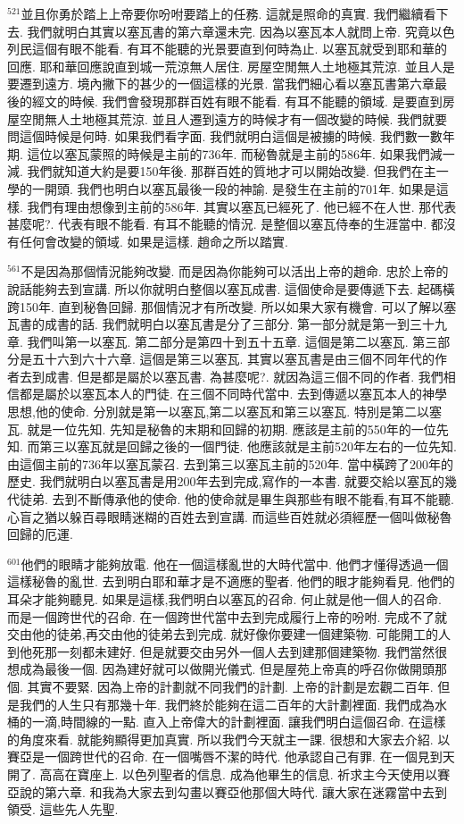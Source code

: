 \documentclass{book}
\begin{document}
$^{521}$並且你勇於踏上上帝要你吩咐要踏上的任務.
這就是照命的真實.
我們繼續看下去.
我們就明白其實以塞瓦書的第六章還未完.
因為以塞瓦本人就問上帝.
究竟以色列民這個有眼不能看.
有耳不能聽的光景要直到何時為止.
以塞瓦就受到耶和華的回應.
耶和華回應說直到城一荒涼無人居住.
房屋空閒無人土地極其荒涼.
並且人是要遷到遠方.
境內撇下的甚少的一個這樣的光景.
當我們細心看以塞瓦書第六章最後的經文的時候.
我們會發現那群百姓有眼不能看.
有耳不能聽的領域.
是要直到房屋空閒無人土地極其荒涼.
並且人遷到遠方的時候才有一個改變的時候.
我們就要問這個時候是何時.
如果我們看字面.
我們就明白這個是被擄的時候.
我們數一數年期.
這位以塞瓦蒙照的時候是主前的736年.
而秘魯就是主前的586年.
如果我們減一減.
我們就知道大約是要150年後.
那群百姓的質地才可以開始改變.
但我們在主一學的一開頭.
我們也明白以塞瓦最後一段的神諭.
是發生在主前的701年.
如果是這樣.
我們有理由想像到主前的586年.
其實以塞瓦已經死了.
他已經不在人世.
那代表甚麼呢?.
代表有眼不能看.
有耳不能聽的情況.
是整個以塞瓦侍奉的生涯當中.
都沒有任何會改變的領域.
如果是這樣.
趙命之所以踏實.

$^{561}$不是因為那個情況能夠改變.
而是因為你能夠可以活出上帝的趙命.
忠於上帝的說話能夠去到宣講.
所以你就明白整個以塞瓦成書.
這個使命是要傳遞下去.
起碼橫跨150年.
直到秘魯回歸.
那個情況才有所改變.
所以如果大家有機會.
可以了解以塞瓦書的成書的話.
我們就明白以塞瓦書是分了三部分.
第一部分就是第一到三十九章.
我們叫第一以塞瓦.
第二部分是第四十到五十五章.
這個是第二以塞瓦.
第三部分是五十六到六十六章.
這個是第三以塞瓦.
其實以塞瓦書是由三個不同年代的作者去到成書.
但是都是屬於以塞瓦書.
為甚麼呢?.
就因為這三個不同的作者.
我們相信都是屬於以塞瓦本人的門徒.
在三個不同時代當中.
去到傳遞以塞瓦本人的神學思想,他的使命.
分別就是第一以塞瓦,第二以塞瓦和第三以塞瓦.
特別是第二以塞瓦.
就是一位先知.
先知是秘魯的末期和回歸的初期.
應該是主前的550年的一位先知.
而第三以塞瓦就是回歸之後的一個門徒.
他應該就是主前520年左右的一位先知.
由這個主前的736年以塞瓦蒙召.
去到第三以塞瓦主前的520年.
當中橫跨了200年的歷史.
我們就明白以塞瓦書是用200年去到完成,寫作的一本書.
就要交給以塞瓦的幾代徒弟.
去到不斷傳承他的使命.
他的使命就是畢生與那些有眼不能看,有耳不能聽.
心盲之猶以躲百尋眼睛迷糊的百姓去到宣講.
而這些百姓就必須經歷一個叫做秘魯回歸的厄運.

$^{601}$他們的眼睛才能夠放電.
他在一個這樣亂世的大時代當中.
他們才懂得透過一個這樣秘魯的亂世.
去到明白耶和華才是不適應的聖者.
他們的眼才能夠看見.
他們的耳朵才能夠聽見.
如果是這樣,我們明白以塞瓦的召命.
何止就是他一個人的召命.
而是一個跨世代的召命.
在一個跨世代當中去到完成履行上帝的吩咐.
完成不了就交由他的徒弟,再交由他的徒弟去到完成.
就好像你要建一個建築物.
可能開工的人到他死那一刻都未建好.
但是就要交由另外一個人去到建那個建築物.
我們當然很想成為最後一個.
因為建好就可以做開光儀式.
但是屋苑上帝真的呼召你做開頭那個.
其實不要緊.
因為上帝的計劃就不同我們的計劃.
上帝的計劃是宏觀二百年.
但是我們的人生只有那幾十年.
我們終於能夠在這二百年的大計劃裡面.
我們成為水桶的一滴,時間線的一點.
直入上帝偉大的計劃裡面.
讓我們明白這個召命.
在這樣的角度來看.
就能夠顯得更加真實.
所以我們今天就主一課.
很想和大家去介紹.
以賽亞是一個跨世代的召命.
在一個嘴唇不潔的時代.
他承認自己有罪.
在一個見到天開了.
高高在寶座上.
以色列聖者的信息.
成為他畢生的信息.
祈求主今天使用以賽亞說的第六章.
和我為大家去到勾畫以賽亞他那個大時代.
讓大家在迷霧當中去到領受.
這些先人先聖.
\end{document}
